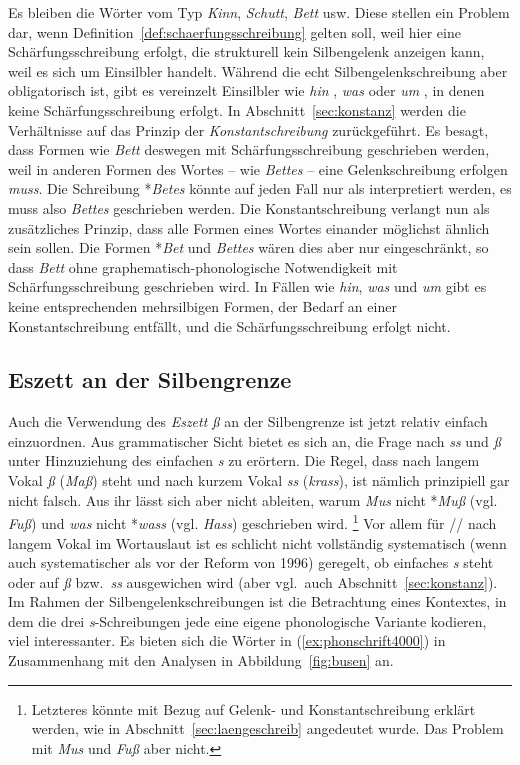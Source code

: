 Es bleiben die Wörter vom Typ \textit{Kinn}, \textit{Schutt}, \textit{Bett} usw.
Diese stellen ein Problem dar, wenn Definition~\ref{def:schaerfungsschreibung} gelten soll, weil hier eine Schärfungsschreibung erfolgt, die strukturell kein Silbengelenk anzeigen kann, weil es sich um Einsilbler handelt.
Während die echt Silbengelenkschreibung aber obligatorisch ist, gibt es vereinzelt Einsilbler wie \textit{hin} \textipa{[hIn]}, \textit{was} \textipa{[vas]} oder \textit{um} \textipa{[PUm]}, in denen keine Schärfungsschreibung erfolgt.
In Abschnitt~\ref{sec:konstanz} werden die Verhältnisse auf das Prinzip der \textit{Konstantschreibung} zurückgeführt.
Es besagt, dass Formen wie \textit{Bett} deswegen mit Schärfungsschreibung geschrieben werden, weil in anderen Formen des Wortes -- wie \zB \textit{Bettes} -- eine Gelenkschreibung erfolgen \textit{muss}.
Die Schreibung *\textit{Betes} könnte auf jeden Fall nur als \textipa{[be:t@s]} interpretiert werden, es muss also \textit{Bettes} geschrieben werden.
Die Konstantschreibung verlangt nun als zusätzliches Prinzip, dass alle Formen eines Wortes einander möglichst ähnlich sein sollen.
Die Formen *\textit{Bet} und \textit{Bettes} wären dies aber nur eingeschränkt, so dass \textit{Bett} ohne graphematisch-phonologische Notwendigkeit mit Schärfungsschreibung geschrieben wird.
In Fällen wie \textit{hin}, \textit{was} und \textit{um} gibt es keine entsprechenden mehrsilbigen Formen, der Bedarf an einer Konstantschreibung entfällt, und die Schärfungsschreibung erfolgt nicht.

\subsection[Eszett an der Silbengrenze]{Eszett an der Silbengrenze}

\label{sec:eszett}

Auch die Verwendung des\textit{ Eszett} \textit{ß} an der Silbengrenze ist jetzt relativ einfach einzuordnen.
Aus grammatischer Sicht bietet es sich an, die Frage nach \textit{ss} und \textit{ß} unter Hinzuziehung des einfachen \textit{s} zu erörtern.
Die Regel, dass nach langem Vokal \textit{ß} (\textit{Maß}) steht und nach kurzem Vokal \textit{ss} (\textit{krass}), ist nämlich prinzipiell gar nicht falsch.
Aus ihr lässt sich aber nicht ableiten, warum \zB \textit{Mus} nicht *\textit{Muß} (vgl. \textit{Fuß}) und \textit{was} nicht *\textit{wass} (vgl. \textit{Hass}) geschrieben wird.%
\footnote{Letzteres könnte mit Bezug auf Gelenk- und Konstantschreibung erklärt werden, wie in Abschnitt~\ref{sec:laengeschreib} angedeutet wurde.
Das Problem mit \textit{Mus} und \textit{Fuß} aber nicht.}
Vor allem für // nach langem Vokal im Wortauslaut ist es schlicht nicht vollständig systematisch (wenn auch systematischer als vor der Reform von 1996) geregelt, ob einfaches \textit{s} steht oder auf \textit{ß} bzw.\ \textit{ss} ausgewichen wird (aber vgl.\ auch Abschnitt~\ref{sec:konstanz}).
Im Rahmen der Silbengelenkschreibungen ist die Betrachtung eines Kontextes, in dem die drei \textit{s}-Schreibungen jede eine eigene phonologische Variante kodieren, viel interessanter.
Es bieten sich die Wörter in (\ref{ex:phonschrift4000}) in Zusammenhang mit den Analysen in Abbildung~\ref{fig:busen} an.


